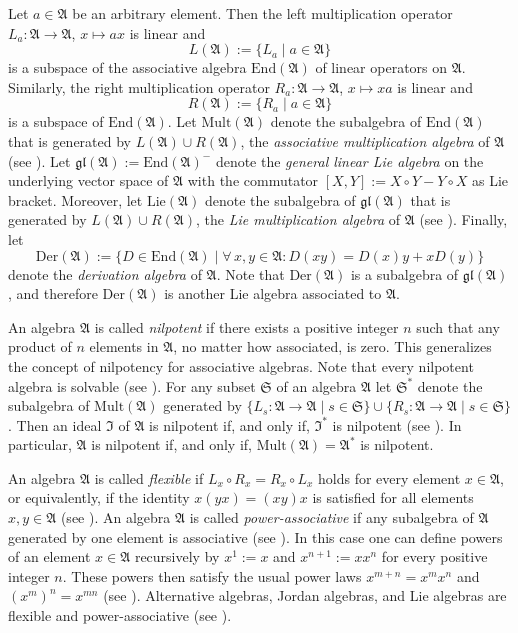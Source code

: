\documentclass{amsart}
\numberwithin{equation}{section}
\newcommand{\der}{\mathrm{Der}}
\newcommand{\lie}{\mathrm{Lie}}
\newcommand{\mult}{\mathrm{Mult}}
\newcommand{\End}{\mathrm{End}}
\newcommand{\af}{\mathfrak{A}}
\newcommand{\Sf}{\mathfrak{S}}
\newcommand{\If}{\mathfrak{I}}
\newcommand{\gl}{\mathfrak{gl}}
\begin{document}
Let $a\in\af$ be an arbitrary element. Then the left multiplication operator $L_a:\af\to\af$, $x
\mapsto ax$ is linear and $$L(\af):=\{L_a\mid a\in\af\}$$ is a subspace of the associative algebra
$\End(\af)$ of linear operators on $\af$. Similarly, the right multiplication operator $R_a:\af\to
\af$, $x\mapsto xa$ is linear and $$R(\af):=\{R_a\mid a\in\af\}$$ is a subspace of $\End(\af)$.
Let $\mult(\af)$ denote the subalgebra of $\End(\af)$ that is generated by $L(\af)\cup R(\af)$,
the {\em associative multiplication algebra\/} of $\af$ (see \cite[Section 2 in Chapter II]{S}). Let
$\gl(\af):=\End(\af)^-$ denote the {\em general linear Lie algebra\/} on the underlying vector
space of $\af$ with the commutator $[X,Y]:=X\circ Y-Y\circ X$ as Lie bracket. Moreover, let $\lie
(\af)$ denote the subalgebra of $\gl(\af)$ that is generated by $L(\af) \cup R(\af)$, the {\em
Lie multiplication algebra\/} of $\af$ (see \cite[Section 3 in Chapter II]{S}). Finally, let $$\der
(\af):=\{D\in\End (\af)\mid\forall\,x,y\in\af:D(xy)=D(x)y+xD(y)\}$$ denote the {\em derivation
algebra\/} of $\af$. Note that $\der(\af)$ is a subalgebra of $\gl(\af)$, and therefore $\der(\af)$
is another Lie algebra associated to $\af$.

An algebra $\af$ is called {\em nilpotent\/} if there exists a positive integer $n$ such that any
product of $n$ elements in $\af$, no matter how associated, is zero. This generalizes the concept
of nilpotency for associative algebras. Note that every nilpotent algebra is solvable (see \cite[p.
18]{S}). For any subset $\Sf$ of an algebra $\af$ let $\Sf^*$ denote the subalgebra of $\mult
(\af)$ generated by $\{L_s:\af\to\af\mid s\in\Sf\}\cup\{R_s:\af\to\af\mid s\in\Sf\}$. Then an
ideal $\If$ of $\af$ is nilpotent if, and only if, $\If^*$ is nilpotent (see \cite[Theorem~2.4]{S}).
In particular, $\af$ is nilpotent if, and only if, $\mult(\af)=\af^*$ is nilpotent.

An algebra $\af$ is called {\em flexible\/} if $L_x\circ R_x=R_x\circ L_x$ holds for every element
$x\in\af$, or equivalently, if the identity $x(yx) =(xy)x$ is satisfied for all elements $x,y\in\af$
(see \cite[p.\ 28]{S}). An algebra $\af$ is called {\em power-associative\/} if any subalgebra of
$\af$ generated by one element is associative (see \cite[p.\ 30]{S}). In this case one can define
powers of an element $x\in\af$ recursively by $x^1:=x$ and $x^{n+1}:=xx^n$ for every positive
integer $n$. These powers then satisfy the usual power laws $x^{m+n}=x^mx^n$ and $(x^m)^n
=x^{mn}$ (see \cite[p.\ 30]{S}). Alternative algebras, Jordan algebras, and Lie algebras are flexible
and power-associative (see \cite[pp. 28, 30, and 92]{S}). 
\end{document}
